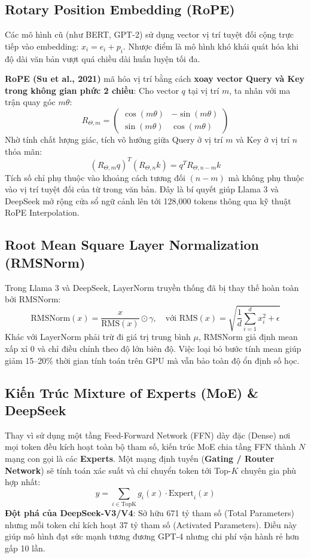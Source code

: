 \subsection{Rotary Position Embedding (RoPE)}
Các mô hình cũ (như BERT, GPT-2) sử dụng vector vị trí tuyệt đối cộng trực tiếp vào embedding: $x_i = e_i + p_i$. Nhược điểm là mô hình khó khái quát hóa khi độ dài văn bản vượt quá chiều dài huấn luyện tối đa.

\textbf{RoPE (Su et al., 2021)} mã hóa vị trí bằng cách \textbf{xoay vector Query và Key trong không gian phức 2 chiều}:
Cho vector $q$ tại vị trí $m$, ta nhân với ma trận quay góc $m\theta$:
\begin{equation}
R_{\Theta, m} = \begin{pmatrix} \cos(m\theta) & -\sin(m\theta) \\ \sin(m\theta) & \cos(m\theta) \end{pmatrix}
\end{equation}
Nhờ tính chất lượng giác, tích vô hướng giữa Query ở vị trí $m$ và Key ở vị trí $n$ thỏa mãn:
\begin{equation}
(R_{\Theta, m} q)^T (R_{\Theta, n} k) = q^T R_{\Theta, n - m} k
\end{equation}
Tích số chỉ phụ thuộc vào khoảng cách tương đối $(n - m)$ mà không phụ thuộc vào vị trí tuyệt đối của từ trong văn bản. Đây là bí quyết giúp Llama 3 và DeepSeek mở rộng cửa sổ ngữ cảnh lên tới 128,000 tokens thông qua kỹ thuật RoPE Interpolation.

\subsection{Root Mean Square Layer Normalization (RMSNorm)}
Trong Llama 3 và DeepSeek, LayerNorm truyền thống đã bị thay thế hoàn toàn bởi RMSNorm:
\begin{equation}
\text{RMSNorm}(x) = \frac{x}{\text{RMS}(x)} \odot \gamma, \quad \text{với } \text{RMS}(x) = \sqrt{\frac{1}{d} \sum_{i=1}^d x_i^2 + \epsilon}
\end{equation}
Khác với LayerNorm phải trừ đi giá trị trung bình $\mu$, RMSNorm giả định mean xấp xỉ 0 và chỉ điều chỉnh theo độ lớn biên độ. Việc loại bỏ bước tính mean giúp giảm 15--20\% thời gian tính toán trên GPU mà vẫn bảo toàn độ ổn định số học.

\subsection{Kiến Trúc Mixture of Experts (MoE) \& DeepSeek}
Thay vì sử dụng một tầng Feed-Forward Network (FFN) dày đặc (Dense) nơi mọi token đều kích hoạt toàn bộ tham số, kiến trúc MoE chia tầng FFN thành $N$ mạng con gọi là các \textbf{Experts}.
Một mạng định tuyến (\textbf{Gating / Router Network}) sẽ tính toán xác suất và chỉ chuyển token tới Top-$K$ chuyên gia phù hợp nhất:
\begin{equation}
y = \sum_{i \in \text{TopK}} g_i(x) \cdot \text{Expert}_i(x)
\end{equation}
\textbf{Đột phá của DeepSeek-V3/V4}: Sở hữu 671 tỷ tham số (Total Parameters) nhưng mỗi token chỉ kích hoạt 37 tỷ tham số (Activated Parameters). Điều này giúp mô hình đạt sức mạnh tương đương GPT-4 nhưng chi phí vận hành rẻ hơn gấp 10 lần.

